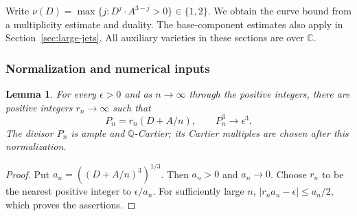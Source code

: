 \documentclass[12pt,a4paper,psamsfonts]{amsart}
\theoremstyle{definition}
\theoremstyle{plain}
\newtheorem{lemma}{Lemma}[section]
\newcommand{\C}{\mathbb C}
\begin{document}
Write $\nu(D)=\max\{j:D^j\cdot A^{3-j}>0\}\in\{1,2\}$.
We obtain the curve bound from a multiplicity estimate and duality.
The base-component estimates also apply in Section~\ref{sec:large-jets}.
All auxiliary varieties in these sections are over $\C$.

\subsubsection{Normalization and numerical inputs}\label{sec:lower-dimensional-inputs}

\begin{lemma}\label{lem:hd-normalization}
For every $\epsilon>0$ and
as $n\to\infty$ through the positive integers, there are
positive integers $r_n\to\infty$ such that
\[
 P_n=r_n(D+A/n),\qquad P_n^3\longrightarrow\epsilon^3.
\]
The divisor $P_n$ is ample and $\mathbb{Q}$-Cartier; its Cartier multiples
are chosen after this normalization.
\end{lemma}
\begin{proof}
Put $a_n=((D+A/n)^3)^{1/3}$. Then $a_n>0$ and $a_n\to0$.
Choose $r_n$ to be the nearest positive integer to $\epsilon/a_n$.
For sufficiently large $n$,
$|r_na_n-\epsilon|\le a_n/2$, which proves the assertions.
\end{proof}
\end{document}
